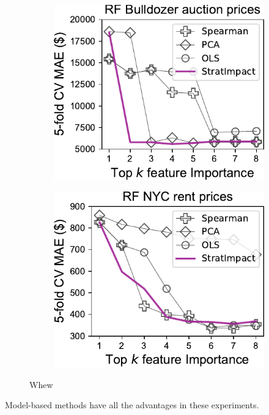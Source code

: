 \documentclass[11pt]{article}
\begin{document}
\begin{figure}
\begin{subfigure}{.245\textwidth}
    \centering
\includegraphics[scale=0.45]{images/bulldozer-topk-baseline-Importance.pdf}
\end{subfigure}
\begin{subfigure}{.245\textwidth}
    \centering
\includegraphics[scale=0.45]{images/rent-topk-baseline-Importance.pdf}
\end{subfigure}
\caption{Whew}
\label{fig:baseline}
\end{figure}

Model-based methods have all the advantages in these experiments.
\end{document}
